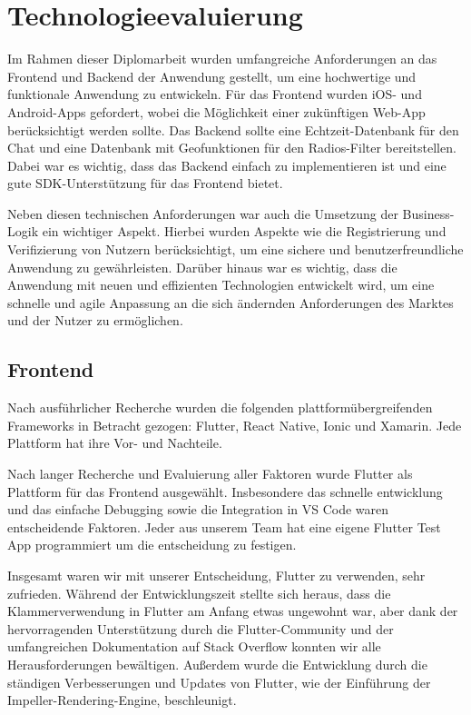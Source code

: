 \author{Martin Hausleitner}
\section{Technologieevaluierung}

Im Rahmen dieser Diplomarbeit wurden umfangreiche Anforderungen an das Frontend und Backend der Anwendung gestellt, um eine hochwertige und funktionale Anwendung zu entwickeln. Für das Frontend wurden iOS- und Android-Apps gefordert, wobei die Möglichkeit einer zukünftigen Web-App berücksichtigt werden sollte. Das Backend sollte eine Echtzeit-Datenbank für den Chat und eine Datenbank mit Geofunktionen für den Radios-Filter bereitstellen. Dabei war es wichtig, dass das Backend einfach zu implementieren ist und eine gute SDK-Unterstützung für das Frontend bietet.

Neben diesen technischen Anforderungen war auch die Umsetzung der Business-Logik ein wichtiger Aspekt. Hierbei wurden Aspekte wie die Registrierung und Verifizierung von Nutzern berücksichtigt, um eine sichere und benutzerfreundliche Anwendung zu gewährleisten. Darüber hinaus war es wichtig, dass die Anwendung mit neuen und effizienten Technologien entwickelt wird, um eine schnelle und agile Anpassung an die sich ändernden Anforderungen des Marktes und der Nutzer zu ermöglichen.


\subsection{Frontend}

Nach ausführlicher Recherche wurden die folgenden plattformübergreifenden Frameworks in Betracht gezogen\cite{cross_platform_framework_comparison}: Flutter, React Native, Ionic und Xamarin. Jede Plattform hat ihre Vor- und Nachteile.

Nach langer Recherche und Evaluierung aller Faktoren wurde Flutter als Plattform für das Frontend ausgewählt. Insbesondere das schnelle entwicklung und das einfache Debugging sowie die Integration in VS Code waren entscheidende Faktoren. Jeder aus unserem Team hat eine eigene Flutter Test App programmiert \cite{flutter_test_apps} um die entscheidung zu festigen.

Insgesamt waren wir mit unserer Entscheidung, Flutter zu verwenden, sehr zufrieden. Während der Entwicklungszeit stellte sich heraus, dass die Klammerverwendung in Flutter am Anfang etwas ungewohnt war, aber dank der hervorragenden Unterstützung durch die Flutter-Community und der umfangreichen Dokumentation auf Stack Overflow konnten wir alle Herausforderungen bewältigen. Außerdem wurde die Entwicklung durch die ständigen Verbesserungen und Updates von Flutter, wie der Einführung der Impeller-Rendering-Engine, beschleunigt. \cite{flutter_impeller}

